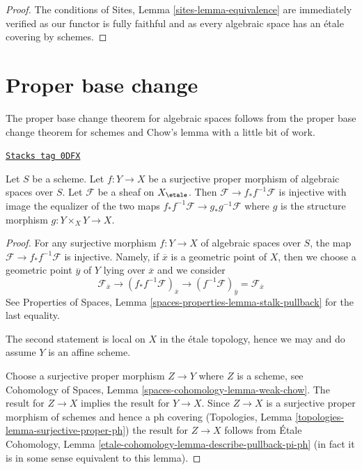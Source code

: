 \begin{proof}
The conditions of Sites, Lemma \ref{sites-lemma-equivalence}
are immediately verified as our functor is fully faithful
and as every algebraic space has an \'etale covering by schemes.
\end{proof}

\section{Proper base change}
\label{spaces-more-cohomology-section-proper-base-change}
The proper base change theorem for algebraic spaces follows from
the proper base change theorem for schemes and Chow's lemma
with a little bit of work.

\begin{lemma}
\label{spaces-more-cohomology-lemma-surjective-proper}
\href{https://stacks.math.columbia.edu/tag/0DFX}{\texttt{Stacks tag 0DFX}}

Let $S$ be a scheme. Let $f : Y \to X$ be a surjective proper morphism
of algebraic spaces over $S$. Let $\mathcal{F}$ be a sheaf on $X_\etale$.
Then $\mathcal{F} \to f_*f^{-1}\mathcal{F}$ is injective with
image the equalizer of the two maps
$f_*f^{-1}\mathcal{F} \to g_*g^{-1}\mathcal{F}$ where
$g$ is the structure morphism $g : Y \times_X Y \to X$.
\end{lemma}

\begin{proof}
For any surjective morphism $f : Y \to X$ of algebraic spaces over $S$,
the map $\mathcal{F} \to f_*f^{-1}\mathcal{F}$ is injective.
Namely, if $\overline{x}$ is a geometric point of $X$, then we
choose a geometric point $\overline{y}$ of $Y$ lying over $\overline{x}$
and we consider
$$
\mathcal{F}_{\overline{x}} \to
(f_*f^{-1}\mathcal{F})_{\overline{x}} \to
(f^{-1}\mathcal{F})_{\overline{y}} = \mathcal{F}_{\overline{x}}
$$
See Properties of Spaces, Lemma \ref{spaces-properties-lemma-stalk-pullback}
for the last equality.

\medskip\noindent
The second statement is local on $X$ in the \'etale topology, hence we may
and do assume $Y$ is an affine scheme.

\medskip\noindent
Choose a surjective proper morphism $Z \to Y$ where $Z$ is a scheme, see
Cohomology of Spaces, Lemma \ref{spaces-cohomology-lemma-weak-chow}.
The result for $Z \to X$ implies the result for $Y \to X$.
Since $Z \to X$ is a surjective proper morphism of schemes
and hence a ph covering
(Topologies, Lemma \ref{topologies-lemma-surjective-proper-ph})
the result for $Z \to X$ follows from
\'Etale Cohomology, Lemma \ref{etale-cohomology-lemma-describe-pullback-pi-ph}
(in fact it is in some sense equivalent to this lemma).
\end{proof}

